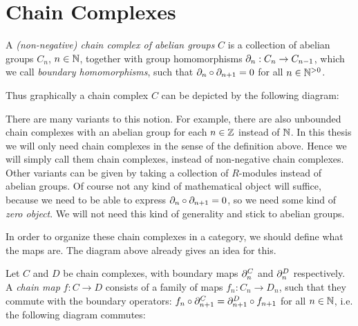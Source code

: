 \section{Chain Complexes}
\label{sec:Chain Complexes}
\begin{definition}
	A \emph{(non-negative) chain complex of abelian groups} $C$ is a collection of abelian groups $C_n$, $n \in \mathbb{N}$, together with group homomorphisms $\partial_n: C_n \to C_{n-1}$, which we call \emph{boundary homomorphisms}, such that $\partial_n \circ \partial_{n+1} = 0$ for all $n \in {\mathbb{N}^{>0}}$.
\end{definition}

Thus graphically a chain complex $C$ can be depicted by the following diagram:
\begin{center}
\end{center}

There are many variants to this notion. For example, there are also unbounded chain complexes with an abelian group for each $n \in \mathbb{Z}$ instead of $\mathbb{N}$. In this thesis we will only need chain complexes in the sense of the definition above. Hence we will simply call them chain complexes, instead of non-negative chain complexes. Other variants can be given by taking a collection of $R$-modules instead of abelian groups. Of course not any kind of mathematical object will suffice, because we need to be able to express $\partial_n \circ \partial_{n+1} = 0$, so we need some kind of \emph{zero object}. We will not need this kind of generality and stick to abelian groups.

In order to organize these chain complexes in a category, we should define what the maps are. The diagram above already gives an idea for this.
\begin{definition}
	Let $C$ and $D$ be chain complexes, with boundary maps $\partial^C_n$ and $\partial^D_n$ respectively. A \emph{chain map} $f: C \to D$ consists of a family of maps $f_n: C_n \to D_n$, such that they commute with the boundary operators: $f_n \circ \partial^C_{n+1} = \partial^D_{n+1} \circ f_{n+1}$ for all $n \in \mathbb{N}$, i.e. the following diagram commutes:
	\begin{center}
	\end{center}
\end{definition}


